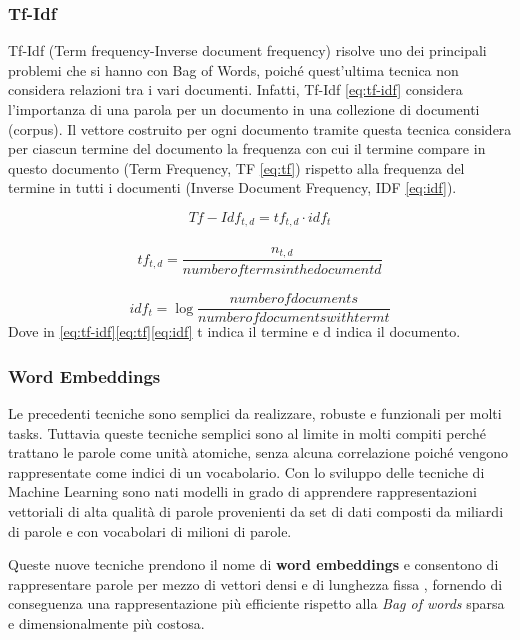 \subsubsection{Tf-Idf}\label{section-tfidf}
Tf-Idf (Term frequency-Inverse document frequency) \cite{manning_raghavan_schutze_2008} risolve uno dei principali problemi che si hanno con Bag of Words, poiché quest'ultima tecnica non considera relazioni tra i vari documenti. Infatti, Tf-Idf \eqref{eq:tf-idf} considera l'importanza di una parola per un documento in una collezione di documenti (corpus).
Il vettore costruito per ogni documento tramite questa tecnica considera per ciascun termine del documento la frequenza con cui il termine compare in questo documento (Term Frequency, TF \eqref{eq:tf}) rispetto alla frequenza del termine in tutti i documenti (Inverse Document Frequency, IDF \eqref{eq:idf}).

\begin{equation}
\label{eq:tf-idf}
   Tf-Idf_{t,d} = tf_{t,d} \cdot idf_t
\end{equation}\\
\begin{equation}
\label{eq:tf}
   tf_{t,d} = \frac{n_{t,d}}{number of terms in the document d} 
\end{equation}\\
\begin{equation}
\label{eq:idf}
   idf_{t} = \log \frac{number of documents}{number of documents with term t} 
\end{equation}
Dove in \eqref{eq:tf-idf}\eqref{eq:tf}\eqref{eq:idf} t indica il termine e d indica il documento.
\\
\subsubsection{Word Embeddings}

Le precedenti tecniche sono semplici da realizzare, robuste e funzionali per molti tasks. Tuttavia queste tecniche semplici sono al limite in molti compiti perché trattano le parole come unità atomiche, senza alcuna correlazione poiché vengono rappresentate come indici di un vocabolario. 
Con lo sviluppo delle tecniche di Machine Learning sono nati modelli in grado di
apprendere rappresentazioni vettoriali di alta qualità di parole provenienti da
set di dati composti da miliardi di parole e con vocabolari di milioni di
parole.

Queste nuove tecniche prendono il nome di \textbf{word embeddings} e
consentono di rappresentare parole per mezzo di vettori densi e di lunghezza
fissa \cite{almeida2019word}, fornendo di conseguenza una rappresentazione più
efficiente rispetto alla \textit{Bag of words} sparsa e dimensionalmente più
costosa.

